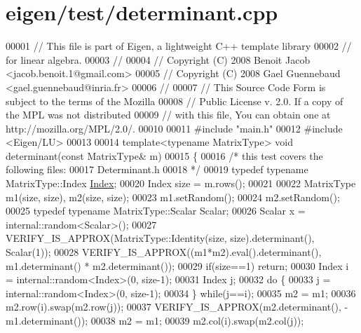 \hypertarget{eigen_2test_2determinant_8cpp_source}{}\section{eigen/test/determinant.cpp}
\label{eigen_2test_2determinant_8cpp_source}

\begin{DoxyCode}
00001 \textcolor{comment}{// This file is part of Eigen, a lightweight C++ template library}
00002 \textcolor{comment}{// for linear algebra.}
00003 \textcolor{comment}{//}
00004 \textcolor{comment}{// Copyright (C) 2008 Benoit Jacob <jacob.benoit.1@gmail.com>}
00005 \textcolor{comment}{// Copyright (C) 2008 Gael Guennebaud <gael.guennebaud@inria.fr>}
00006 \textcolor{comment}{//}
00007 \textcolor{comment}{// This Source Code Form is subject to the terms of the Mozilla}
00008 \textcolor{comment}{// Public License v. 2.0. If a copy of the MPL was not distributed}
00009 \textcolor{comment}{// with this file, You can obtain one at http://mozilla.org/MPL/2.0/.}
00010 
00011 \textcolor{preprocessor}{#include "main.h"}
00012 \textcolor{preprocessor}{#include <Eigen/LU>}
00013 
00014 \textcolor{keyword}{template}<\textcolor{keyword}{typename} MatrixType> \textcolor{keywordtype}{void} determinant(\textcolor{keyword}{const} MatrixType& m)
00015 \{
00016   \textcolor{comment}{/* this test covers the following files:}
00017 \textcolor{comment}{     Determinant.h}
00018 \textcolor{comment}{  */}
00019   \textcolor{keyword}{typedef} \textcolor{keyword}{typename} MatrixType::Index \hyperlink{namespace_eigen_a62e77e0933482dafde8fe197d9a2cfde}{Index};
00020   Index size = m.rows();
00021 
00022   MatrixType m1(size, size), m2(size, size);
00023   m1.setRandom();
00024   m2.setRandom();
00025   \textcolor{keyword}{typedef} \textcolor{keyword}{typename} MatrixType::Scalar Scalar;
00026   Scalar x = internal::random<Scalar>();
00027   VERIFY\_IS\_APPROX(MatrixType::Identity(size, size).determinant(), Scalar(1));
00028   VERIFY\_IS\_APPROX((m1*m2).eval().determinant(), m1.determinant() * m2.determinant());
00029   \textcolor{keywordflow}{if}(size==1) \textcolor{keywordflow}{return};
00030   Index i = internal::random<Index>(0, size-1);
00031   Index j;
00032   \textcolor{keywordflow}{do} \{
00033     j = internal::random<Index>(0, size-1);
00034   \} \textcolor{keywordflow}{while}(j==i);
00035   m2 = m1;
00036   m2.row(i).swap(m2.row(j));
00037   VERIFY\_IS\_APPROX(m2.determinant(), -m1.determinant());
00038   m2 = m1;
00039   m2.col(i).swap(m2.col(j));

\end{DoxyCode}
